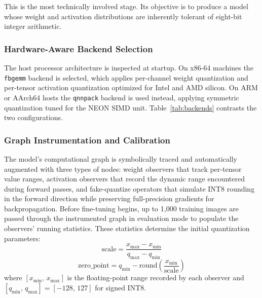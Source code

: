 \documentclass[conference]{IEEEtran}
\begin{document}
This is the most technically involved stage. Its objective is to produce a model whose weight and activation distributions are inherently tolerant of eight-bit integer arithmetic.

\subsubsection{Hardware-Aware Backend Selection}
The host processor architecture is inspected at startup. On x86-64 machines the \texttt{fbgemm} backend is selected, which applies per-channel weight quantization and per-tensor activation quantization optimized for Intel and AMD silicon. On ARM or AArch64 hosts the \texttt{qnnpack} backend is used instead, applying symmetric quantization tuned for the NEON SIMD unit. Table~\ref{tab:backends} contrasts the two configurations.

\begin{table}[htbp]
\caption{Quantization Backend Properties}
\label{tab:backends}
\centering
{}
\end{table}

\subsubsection{Graph Instrumentation and Calibration}
The model's computational graph is symbolically traced and automatically augmented with three types of nodes: weight observers that track per-tensor value ranges, activation observers that record the dynamic range encountered during forward passes, and fake-quantize operators that simulate INT8 rounding in the forward direction while preserving full-precision gradients for backpropagation. Before fine-tuning begins, up to 1{,}000 training images are passed through the instrumented graph in evaluation mode to populate the observers' running statistics. These statistics determine the initial quantization parameters:
\begin{equation}
\text{scale} = \frac{x_{\max} - x_{\min}}{q_{\max} - q_{\min}}
\label{eq:scale}
\end{equation}
\begin{equation}
\text{zero\_point} = q_{\min} - \text{round}\!\left(\frac{x_{\min}}{\text{scale}}\right)
\label{eq:zp}
\end{equation}
where $[x_{\min},\,x_{\max}]$ is the floating-point range recorded by each observer and $[q_{\min},\,q_{\max}] = [-128,\,127]$ for signed INT8.
\end{document}
